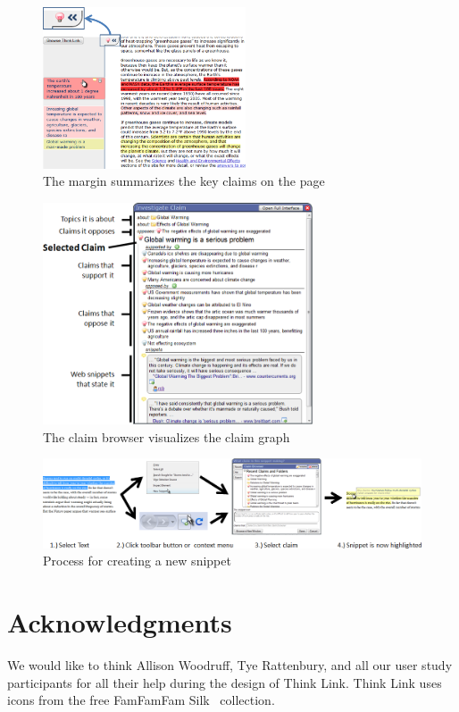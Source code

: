 \documentclass{chi2009}
\begin{document}
\begin{figure}[tb]
	\begin{center}
	\includegraphics[width=6cm]{../screenshots/sidebar_diagram.png}
	\caption{The margin summarizes the key claims on the page}
	\label{margin}
	\end{center}
\end{figure}


\begin{figure}[tb]
	\begin{center}
	\includegraphics[width=8cm]{../screenshots/claimbrowse_diagram.png}
	\caption{The claim browser visualizes the claim graph}
	\label{claimbrowse_diagram}
	\end{center}
\end{figure}

\begin{figure}[tb]
	\begin{center}
	\includegraphics[width=16cm]{../screenshots/newsnip_all.png}
	\caption{Process for creating a new snippet}
	\label{createprocess}
	\end{center}
\end{figure}

\section{Acknowledgments}

We would like to think Allison Woodruff, Tye Rattenbury, and all our user study participants for all their help during the design of Think Link. Think Link uses icons from the free FamFamFam Silk~\cite{silkicons} collection.



\end{document}
